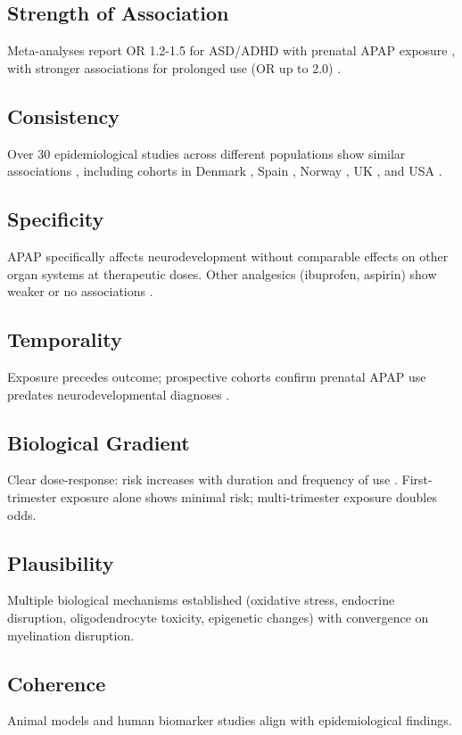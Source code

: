 \documentclass[11pt]{article}
\let\oldsubsection\subsection
\renewcommand{\subsection}[1]{\oldsubsection{#1}\setlength{\leftskip}{0.75em}}
\begin{document}
\subsection{Strength of Association}
Meta-analyses report OR 1.2-1.5 for ASD/ADHD with prenatal APAP exposure \citep{masarwa2018}, with stronger associations for prolonged use (OR up to 2.0) \citep{chen2023,liew2014}.

\subsection{Consistency}
Over 30 epidemiological studies across different populations show similar associations \citep{navarro2025}, including cohorts in Denmark \citep{liew2016}, Spain \citep{avella-garcia2016}, Norway \citep{brandlistuen2013}, UK \citep{stergiakouli2016}, and USA \citep{ji2020}.

\subsection{Specificity}
APAP specifically affects neurodevelopment without comparable effects on other organ systems at therapeutic doses. Other analgesics (ibuprofen, aspirin) show weaker or no associations \citep{masarwa2018}.

\subsection{Temporality}
Exposure precedes outcome; prospective cohorts confirm prenatal APAP use predates neurodevelopmental diagnoses \citep{liew2016}.

\subsection{Biological Gradient}
Clear dose-response: risk increases with duration and frequency of use \citep{liew2014,chen2023}. First-trimester exposure alone shows minimal risk; multi-trimester exposure doubles odds.

\subsection{Plausibility}
Multiple biological mechanisms established (oxidative stress, endocrine disruption, oligodendrocyte toxicity, epigenetic changes) with convergence on myelination disruption.

\subsection{Coherence}
Animal models \citep{viberg2014,blecharz2018,philippot2022} and human biomarker studies \citep{ji2020,baker2020} align with epidemiological findings.
\end{document}
